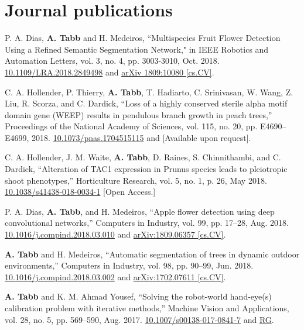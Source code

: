\documentclass[letterpaper,11pt]{article}
\begin{document}
\section{Journal publications}
\begin{enumerate}[noitemsep, leftmargin=*,label={[\arabic*]}]
\item{P. A. Dias, \textbf{A. Tabb} and H. Medeiros, ``Multispecies Fruit Flower Detection Using a Refined Semantic Segmentation Network," in IEEE Robotics and Automation Letters, vol. 3, no. 4, pp. 3003-3010, Oct. 2018. \href{https://doi.org/10.1109/LRA.2018.2849498}{10.1109/LRA.2018.2849498} and \href{https://arxiv.org/abs/1809.10080}{arXiv 1809:10080 [cs.CV]}.}

\item{C. A. Hollender, P. Thierry, \textbf{A. Tabb}, T. Hadiarto, C. Srinivasan, W. Wang, Z. Liu, R. Scorza, and C. Dardick, ``Loss of a highly conserved sterile alpha motif domain gene (WEEP) results in pendulous branch growth in peach trees,” Proceedings of the National Academy of Sciences, vol. 115, no. 20, pp. E4690–E4699, 2018. \href{https://doi.org/10.1073/pnas.1704515115}{10.1073/pnas.1704515115} and [Available upon request].}

\item{C. A. Hollender, J. M. Waite, \textbf{A. Tabb}, D. Raines, S. Chinnithambi, and C. Dardick, ``Alteration of TAC1 expression in Prunus species leads to pleiotropic shoot phenotypes,” Horticulture Research, vol. 5, no. 1, p. 26, May 2018. \href{https://doi.org/10.1038/s41438-018-0034-1}{10.1038/s41438-018-0034-1} [Open Access.]}

\item{P. A. Dias, \textbf{A. Tabb}, and H. Medeiros, ``Apple flower detection using deep convolutional networks,” Computers in Industry, vol. 99, pp. 17–28, Aug. 2018. \href{https://doi.org/10.1016/j.compind.2018.03.010}{10.1016/j.compind.2018.03.010} and \href{https://arxiv.org/abs/1809.06357}{arXiv:1809.06357 [cs.CV]}.}

\item{\textbf{A. Tabb} and H. Medeiros, ``Automatic segmentation of trees in dynamic outdoor environments,” Computers in Industry, vol. 98, pp. 90–99, Jun. 2018. \href{https://doi.org/10.1016/j.compind.2018.03.002}{10.1016/j.compind.2018.03.002} and \href{https://arxiv.org/pdf/1702.07611.pdf}{arXiv:1702.07611 [cs.CV]}.}

\item{\textbf{A. Tabb} and K. M. Ahmad Yousef, “Solving the robot-world hand-eye(s) calibration problem with iterative methods,” Machine Vision and Applications, vol. 28, no. 5, pp. 569–590, Aug. 2017. \href{https://doi.org/10.1007/s00138-017-0841-7}{10.1007/s00138-017-0841-7} and \href{https://www.researchgate.net/publication/316625160_Solving_the_robot-world_hand-eyes_calibration_problem_with_iterative_methods}{RG}.}


\end{enumerate}
\end{document}
